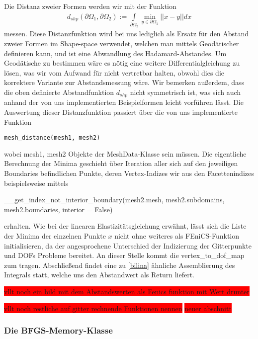 Die Distanz zweier Formen werden wir mit der Funktion
\begin{align}\label{distfktdef}
	d_{shp}(\partial\Omega_1, \partial\Omega_2) := \underset{\partial\Omega_2}{\int} \underset{y\in\partial\Omega_1}{\min} \vert\vert x - y \vert\vert dx
\end{align}
messen. Diese Distanzfunktion wird bei uns lediglich als Ersatz für den Abstand zweier Formen im Shape-space verwendet, welchen man mittels Geodätischer definieren kann, und ist eine Abwandlung des Hadamard-Abstandes. Um Geodätische zu bestimmen wäre es nötig eine weitere Differentialgleichung zu lösen, was wir vom Aufwand für nicht vertretbar halten, obwohl dies die korrektere Variante zur Abstandsmessung wäre. Wir bemerken außerdem, dass die oben definierte Abstandfunktion $d_{shp}$ nicht symmetrisch ist, was sich auch anhand der von uns implementierten Beispielformen leicht vorführen lässt. Die Auswertung dieser Distanzfunktion passiert über die von uns implementierte Funktion
\begin{lstlisting}
mesh_distance(mesh1, mesh2)
\end{lstlisting}
wobei \textsf{mesh1, mesh2} Objekte der \textsf{MeshData}-Klasse sein müssen. Die eigentliche Berechnung der Minima geschieht über Iteration aller sich auf den jeweiligen Boundaries befindlichen Punkte, deren Vertex-Indizes wir aus den Facettenindizes beispielsweise mittels     
\begin{center}
\textsf{\_\_get\_index\_not\_interior\_boundary(mesh2.mesh, mesh2.subdomains, mesh2.boundaries, interior = False)}
\end{center}
erhalten. Wie bei der linearen Elastizitätsgleichung erwähnt, lässt sich die Liste der Minima der einzelnen Punkte $x$ nicht ohne weiteres als FEniCS-Funktion initialisieren, da der angesprochene Unterschied der Indizierung der Gitterpunkte und DOFs Probleme bereitet. An dieser Stelle kommt die \textsf{vertex\_to\_dof\_map} zum tragen. Abschließend findet eine zu \ref{bilina} ähnliche Assemblierung des Integrals statt, welche uns den Abstandwert als Return liefert. 

\colorbox{red}{vllt noch ein bild mit dem Abstandswerten als Fenics funktion mit Wert drunter}

\colorbox{red}{vllt noch restliche auf gitter rechnende Funktionen nennen}
\colorbox{red}{neuer abschnitt}
\subsubsection{Die BFGS-Memory-Klasse}

